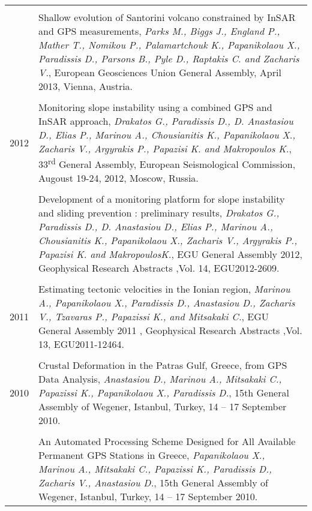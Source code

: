 \documentclass[a4paper,10pt]{article} %
\begin{document}
\begin{longtable}{r|p{14cm}}
  &\\

  & Shallow evolution of Santorini volcano constrained by InSAR and GPS measurements,
  \emph{Parks M., Biggs J., England P., Mather T., Nomikou P., Palamartchouk K., Papanikolaou X., Paradissis D., Parsons B., Pyle D., Raptakis C. and Zacharis V.},
  European Geosciences Union General Assembly, April 2013, Vienna, Austria.\\

\multicolumn{2}{c}{} \\
  \textsc{2012}
  & Monitoring slope instability using a combined GPS and InSAR approach,
  \emph{Drakatos G., Paradissis D., D. Anastasiou D., Elias P., Marinou A., Chousianitis K., Papanikolaou X., Zacharis V., Argyrakis P., Papazisi K. and Makropoulos K.},
  33\textsuperscript{rd} General Assembly, European Seismological Commission, Augoust 19-24, 2012, Moscow, Russia.\\

  &\\

  & Development of a monitoring platform for slope instability and sliding prevention : preliminary results,
  \emph{Drakatos G., Paradissis D., D. Anastasiou D., Elias P., Marinou A., Chousianitis K., Papanikolaou X., Zacharis V., Argyrakis P., Papazisi K. and MakropoulosK.},
  EGU General Assembly 2012, Geophysical Research Abstracts ,Vol. 14, EGU2012-2609.\\

\multicolumn{2}{c}{} \\
  \textsc{2011}
  & Estimating tectonic velocities in the Ionian region, 
  \emph{Marinou Α., Papanikolaou X., Paradissis D., Anastasiou D., Zacharis V., Tzavaras P., Papazissi K., and Mitsakaki C.},
  EGU General Assembly 2011 , Geophysical Research Abstracts ,Vol. 13, EGU2011-12464.\\

\multicolumn{2}{c}{} \\
  \textsc{2010}
  & Crustal Deformation in the Patras Gulf, Greece, from GPS Data Analysis,
  \emph{Anastasiou D., Marinou A., Mitsakaki C., Papazissi K., Papanikolaou X., Paradissis D.},
  15th General Assembly of Wegener, Istanbul, Turkey, 14 – 17 September 2010.\\

  &\\

  & An Automated Processing Scheme Designed for All Available Permanent GPS Stations in Greece,
  \emph{Papanikolaou X., Marinou A., Mitsakaki C., Papazissi K., Paradissis D., Zacharis V., Anastasiou D.},
  15th General Assembly of Wegener, Istanbul, Turkey, 14 – 17 September 2010.\\


\end{longtable}
\end{document}
